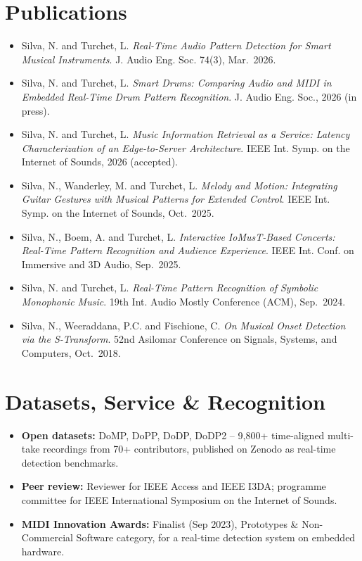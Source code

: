 \documentclass[11pt]{article}
\begin{document}
\section*{Publications \footnotesize {}}
\begin{itemize}[leftmargin=1.2em, itemsep=-0.25em]
    \item Silva, N. and Turchet, L. \textit{Real-Time Audio Pattern Detection for Smart Musical Instruments}. J. Audio Eng. Soc. 74(3), Mar.~2026.
    \item Silva, N. and Turchet, L. \textit{Smart Drums: Comparing Audio and MIDI in Embedded Real-Time Drum Pattern Recognition}. J. Audio Eng. Soc., 2026 (in press).
    \item Silva, N. and Turchet, L. \textit{Music Information Retrieval as a Service: Latency Characterization of an Edge-to-Server Architecture}. IEEE Int. Symp. on the Internet of Sounds, 2026 (accepted).
    \item Silva, N., Wanderley, M. and Turchet, L. \textit{Melody and Motion: Integrating Guitar Gestures with Musical Patterns for Extended Control}. IEEE Int. Symp. on the Internet of Sounds, Oct.~2025.
    \item Silva, N., Boem, A. and Turchet, L. \textit{Interactive IoMusT-Based Concerts: Real-Time Pattern Recognition and Audience Experience}. IEEE Int. Conf. on Immersive and 3D Audio, Sep.~2025.
    \item Silva, N. and Turchet, L. \textit{Real-Time Pattern Recognition of Symbolic Monophonic Music}. 19th Int. Audio Mostly Conference (ACM), Sep.~2024.
    \item Silva, N., Weeraddana, P.C. and Fischione, C. \textit{On Musical Onset Detection via the S-Transform}. 52nd Asilomar Conference on Signals, Systems, and Computers, Oct.~2018.
\end{itemize}

\vspace{-0.3em}
\section*{Datasets, Service \& Recognition}
\begin{itemize}[leftmargin=1.2em, itemsep=-0.25em]
    \item \textbf{Open datasets:} DoMP, DoPP, DoDP, DoDP2 -- 9,800+ time-aligned multi-take recordings from 70+ contributors, published on Zenodo as real-time detection benchmarks.
    \item \textbf{Peer review:} Reviewer for IEEE Access and IEEE I3DA; programme committee for IEEE International Symposium on the Internet of Sounds.
    \item \textbf{MIDI Innovation Awards:} Finalist (Sep 2023), Prototypes \& Non-Commercial Software category, for a real-time detection system on embedded hardware.
\end{itemize}
\end{document}
